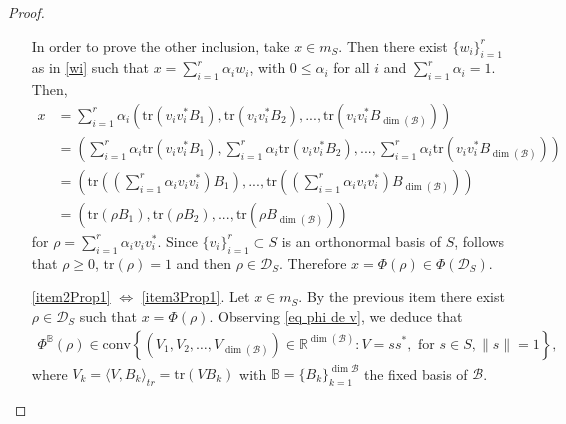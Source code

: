 \documentclass[10pt,a4paper]{amsart}
\def\R{\mathbb R}
\def\calB{\mathcal B}
\def\calD{\mathcal D}
\def\tr{\text{tr}}
\begin{document}
\begin{proof}
\begin{enumerate}
	In order to prove the other inclusion, take $x\in m_S$. Then there exist  $\{w_i\}_{i=1}^{r}$ as in \eqref{wi} such that
	 $x=\sum_{i=1}^{r}\alpha_iw_i$, with $0\leq \alpha_i$ for all $i$ and $\sum_{i=1}^{r}\alpha_i=1$. Then, 
	 \begin{align*}
	 	x&= \sum_{i=1}^{r}\alpha_i\left( \tr(v_i v_i^* B_1),\tr(v_i v_i^* B_2),...,\tr(v_i v_i^* B_{\dim(\mathcal{B})})\right) \\
	 	&=  \left( \sum_{i=1}^{r}\alpha_i\tr(v_i v_i^* B_1),\sum_{i=1}^{r}\alpha_i\tr(v_i v_i^* B_2),...,\sum_{i=1}^{r}\alpha_i\tr(v_i v_i^* B_{\dim(\mathcal{B})})\right) \\
	 	&= \left(\tr\left( \left( \sum_{i=1}^{r}\alpha_iv_i v_i^*\right)  B_1\right) 
	 	,...,\tr\left( \left( \sum_{i=1}^{r}\alpha_iv_i v_i^*\right)  B_{\dim(\mathcal{B})}\right) \right) \\
	 	&= \left(\tr\left( \rho B_1\right) ,\tr\left(\rho  B_2\right) ,...,\tr\left( \rho B_{\dim(\mathcal{B})}\right) \right)
	 \end{align*}
	 for $\rho=\sum_{i=1}^{r}\alpha_iv_i v_i^*$.	 
	 Since $\{v_i\}_{i=1}^r\subset S$ is an orthonormal basis of $S$, follows that $\rho\geq 0$, 
	 $\tr(\rho)=1$ and then $\rho \in \mathcal{D}_S$. Therefore $x= \Phi(\rho)\in \Phi(\mathcal{D}_S)$.	 
	 
	\item[\ref{item2Prop1} $\Leftrightarrow$ \ref{item3Prop1}.] Let $x\in m_S$. By the previous item there exist  $\rho\in\calD_{S}$ such that $x=\Phi(\rho)$. Observing \eqref{eq phi de v}, we deduce that 
	\begin{equation*}
		\begin{split}
	\Phi^\mathbb{B}(\rho)\in \text{conv}  \left\{ (V_1,V_2,\dots,V_{\dim(\calB)})\in\R^{\dim(\calB)}:   
	V=s s^*, \text{ for }  
	s\in S,    
	  	    \|s\|=1  \right\}  ,		
		\end{split}
	\end{equation*}
	where $V_k=\langle V, B_k\rangle_{tr}=\tr(V B_k)$ with $\mathbb{B}=\{B_k\}_{k=1}^{\dim \calB}$ the fixed basis of $\calB$.
	

\end{enumerate}
\end{proof}
\end{document}
